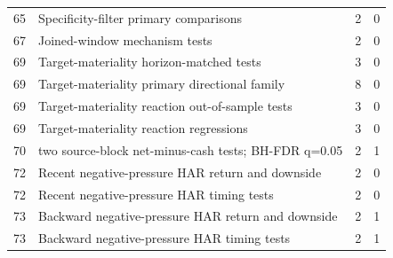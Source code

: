 \begin{longtable}{r p{9.2cm} rr}
65 & Specificity-filter primary comparisons & 2 & 0 \\
67 & Joined-window mechanism tests & 2 & 0 \\
69 & Target-materiality horizon-matched tests & 3 & 0 \\
69 & Target-materiality primary directional family & 8 & 0 \\
69 & Target-materiality reaction out-of-sample tests & 3 & 0 \\
69 & Target-materiality reaction regressions & 3 & 0 \\
70 & two source-block net-minus-cash tests; BH-FDR q=0.05 & 2 & 1 \\
72 & Recent negative-pressure HAR return and downside & 2 & 0 \\
72 & Recent negative-pressure HAR timing tests & 2 & 0 \\
73 & Backward negative-pressure HAR return and downside & 2 & 1 \\
73 & Backward negative-pressure HAR timing tests & 2 & 1 \\
\bottomrule
\end{longtable}
\endgroup

